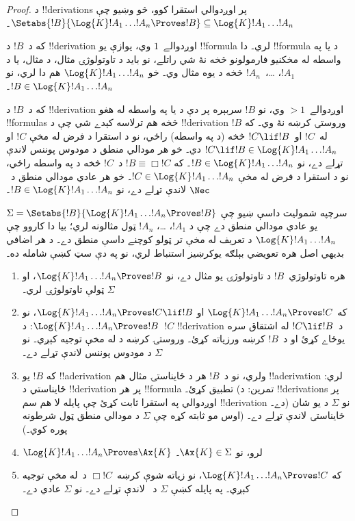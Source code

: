 \documentclass[../../../include/open-logic-section]{subfiles}
\begin{document}
\begin{proof}
  د !!{derivation}s پر اوږدوالي استقرا کوو، څو وښيو چې
  $\Setabs{!B}{\Log{K} !A_1 \dots !A_n \Proves !B} \subseteq
  \Log{K} !A_1 \dots !A_n$۔

  که د~$!B$ د !!{derivation} اوږدوالے~$1$ وي، يوازې
  يو !!{formula} لري۔ دا !!{formula} د \MP{} يا \Nec
  په واسطه له مخکنيو فارمولونو څخه نۀ شي راتلے، نو
  بايد د تاوتولوژۍ مثال، د  مثال، يا د $!A_1$، \dots،~$!A_n$
  څخه د يوه مثال وي۔ خو $\Log{K}!A_1\dots!A_n$ هم
  دا لري، نو $!B \in \Log{K}!A_1 \dots !A_n$۔

  که د~$!B$ د !!{derivation} اوږدوالے~$> 1$ وي، نو
  $!B$ سربېره پر دې د \MP{} يا \Nec{} په واسطه له
  هغو !!{formula}s څخه هم ترلاسه کېدے شي چې د
  !!{derivation} وروستۍ کرښه نۀ وي۔ که $!B$ له~$!C$
  او~$!C \lif !B$ څخه (د \MP په واسطه) راځي، نو
  د استقرا د فرض له مخې $!C$ او $!C \lif !B \in
  \Log{K}!A_1 \dots !A_n$ دي۔ خو هر مودالي منطق
  د مودوس پوننس لاندې تړلے دے، نو
  $!B \in \Log{K}!A_1 \dots !A_n$۔ که
  $!B \equiv \Box !C$ د~$!C$ څخه د \Nec په واسطه
  راځي، نو د استقرا د فرض له مخې $!C
  \in \Log{K}!A_1 \dots !A_n$۔ خو هر عادي مودالي
  منطق د~$\Nec$ لاندې تړلے دے، نو
  $!B \in \Log{K}!A_1\dots!A_n$۔

  سرچپه شموليت داسې ښيو چې
  $\Sigma = \Setabs{!B}{\Log{K} !A_1 \dots !A_n \Proves !B }$
  يو عادي مودالي منطق دے چې د $!A_1$، \dots، $!A_n$
  ټول مثالونه لري؛ بيا دا کاروو چې
  $\Log{K} !A_1 \dots !A_n$ د تعريف له مخې تر ټولو
  کوچنے داسې منطق دے۔ د هر اضافي بديهي اصل هره تعويضي
  بېلګه يو‌کرښيز استنباط لري، نو په دې سټ کښې شامله ده۔
  \begin{enumerate}
    \item هره تاوتولوژي~$!B$ د تاوتولوژۍ يو مثال دے، نو
      $\Log{K}!A_1\dots!A_n \Proves !B$، او $\Sigma$
      ټولې تاوتولوژۍ لري۔
    \item که $\Log{K}!A_1\dots!A_n \Proves !C$ او
      $\Log{K}!A_1\dots!A_n \Proves !C \lif !B$، نو
      $\Log{K}!A_1\dots!A_n \Proves !B$: د~$!C$
      !!{derivation} د~$!C \lif !B$ له اشتقاق
      سره يوځاے کړئ او د~$!B$ کرښه ورزياته کړئ۔
      وروستۍ کرښه د \MP{} له مخې توجيه کېږي۔ نو
      $\Sigma$ د مودوس پوننس لاندې تړلے دے۔
    \item که $!B$ يو !!a{derivation} ولري، نو د~$!B$
      هر د ځايناستۍ مثال هم !!a{derivation} لري:
      ځايناستي د !!{derivation} پر هر !!{formula}
      تطبيق کړئ۔ (تمرین: د !!{derivation}s پر اوږدوالي
      په استقرا ثابت کړئ چې پايله لا هم سم
      !!{derivation} دے۔) نو $\Sigma$ د يو شان
      ځايناستۍ لاندې تړلے دے۔ (اوس مو ثابته کړه
      چې $\Sigma$ د مودالي منطق ټول شرطونه پوره کوي۔)
    \item $\Log{K}!A_1\dots!A_n \Proves \Ax{K}$ لرو، نو
      $\Ax{K} \in \Sigma$۔
    \item که $\Log{K}!A_1\dots!A_n \Proves !C$، نو
      زياته شوې کرښه~$\Box !C$ د~\Nec له مخې
      توجيه کېږي۔ په پايله کښې $\Sigma$ د~\Nec
      لاندې تړلے دے۔ نو $\Sigma$ عادي دے۔
  \end{enumerate}
\end{proof}
\end{document}
